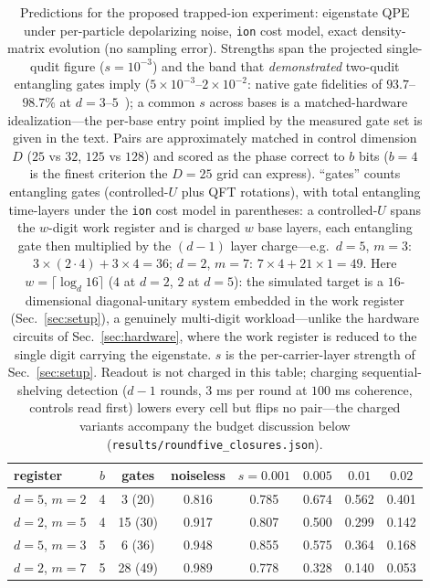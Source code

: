 \documentclass[aps,pra,reprint,superscriptaddress,nofootinbib,floatfix]{revtex4-2}
\begin{document}
\begin{table}[t]
\caption{Predictions for the proposed trapped-ion experiment:
eigenstate QPE under per-particle depolarizing noise, \texttt{ion}
cost model, exact density-matrix evolution (no sampling error).
Strengths span the projected single-qudit figure ($s=10^{-3}$) and
the band that \emph{demonstrated} two-qudit entangling gates imply
($5\times10^{-3}$--$2\times10^{-2}$: native gate fidelities of
$93.7$--$98.7\%$ at $d=3$--$5$~\cite{hrmo2023}); a common $s$ across
bases is a matched-hardware idealization---the per-base entry point
implied by the measured gate set is given in the text. Pairs are
approximately matched in control dimension $D$ ($25$ vs $32$, $125$
vs $128$) and scored as the phase correct to $b$ bits ($b=4$ is the
finest criterion the $D=25$ grid can express). ``gates'' counts
entangling gates (controlled-$U$ plus QFT rotations), with total
entangling time-layers under the \texttt{ion} cost model in
parentheses: a controlled-$U$ spans the $w$-digit work register and
is charged $w$ base layers, each
entangling gate then multiplied by the $(d{-}1)$ layer charge---e.g.\
$d{=}5$, $m{=}3$: $3\times(2\cdot4)+3\times4=36$; $d{=}2$, $m{=}7$:
$7\times4+21\times1=49$. Here $w=\lceil\log_d 16\rceil$ ($4$ at
$d{=}2$, $2$ at $d{=}5$): the simulated target is a $16$-dimensional
diagonal-unitary system embedded in the work register
(Sec.~\ref{sec:setup}), a genuinely multi-digit workload---unlike the
hardware circuits of Sec.~\ref{sec:hardware}, where the work register
is reduced to the single digit carrying the eigenstate. $s$ is the
per-carrier-layer strength of
Sec.~\ref{sec:setup}.
Readout is not charged in this table; charging sequential-shelving
detection ($d-1$ rounds, $3$ ms per round at $100$ ms coherence,
controls read first) lowers every cell but flips no pair---the
charged variants accompany the budget discussion below
(\texttt{results/roundfive\_closures.json}).}
\label{tab:prediction}
\begin{ruledtabular}
\begin{tabular}{lccccccc}
register & $b$ & gates & noiseless & $s{=}0.001$ & $0.005$ & $0.01$ & $0.02$ \\
\hline
$d{=}5$, $m{=}2$ & 4 & 3 (20)  & 0.816 & 0.785 & 0.674 & 0.562 & 0.401 \\
$d{=}2$, $m{=}5$ & 4 & 15 (30) & 0.917 & 0.807 & 0.500 & 0.299 & 0.142 \\
$d{=}5$, $m{=}3$ & 5 & 6 (36)  & 0.948 & 0.855 & 0.575 & 0.364 & 0.168 \\
$d{=}2$, $m{=}7$ & 5 & 28 (49) & 0.989 & 0.778 & 0.328 & 0.140 & 0.053 \\
\end{tabular}
\end{ruledtabular}
\end{table}
\end{document}
